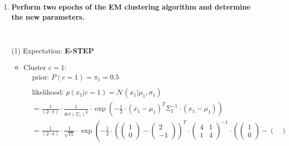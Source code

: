 \documentclass[12pt]{article}
\begin{document}
\begin{enumerate}
    \item \textbf{Perform two epochs of the EM clustering algorithm and determine the new parameters.}
    
    \vspace{10pt}
    \colorbox{codeblue}{\textcolor{white}{FIRST EM EPOCH}}

    \vspace{10pt}
    (1) Expectation: \textbf{\textcolor{codeblue}{E-STEP}}
        
        \vspace{10pt}

        \vspace{10pt}
        \begin{itemize}[label=]
            \item Cluster $c=1$:
            \begin{equation*}
                \begin{aligned}
                    &\text{prior: } P(c=1) = \pi_1 = \mathbf{0.5} \\
                    \\
                    &\text{likelihood: } p(x_1|c=1) = \mathcal{N}(x_1| \mu_1, \sigma_1) \\
                    &= \frac{1}{(2 \cdot \pi)} \cdot \frac{1}{det(\Sigma_1)^{\frac{1}{2}}} \cdot \exp \left( -\frac{1}{2} \cdot (x_1 - \mu_1)^{T} \Sigma_1^{-1} \cdot (x_1 - \mu_1) \right)\\
                    &= \frac{1}{(2 \cdot \pi)} \cdot \frac{1}{\sqrt{15}} \cdot \exp \left( -\frac{1}{2} \cdot \left(\begin{pmatrix}
                    1\\
                    0
                    \end{pmatrix} - \begin{pmatrix}
                    2\\
                    -1
                    \end{pmatrix}\right)^{T} \cdot \begin{pmatrix}
                    4 & 1\\
                    1 & 4
                    \end{pmatrix}^{-1} \cdot \left(\begin{pmatrix}
                    1\\
                    0
                    \end{pmatrix} - \begin{pmatrix}

\end{pmatrix}
\end{aligned}
\end{equation*}
\end{itemize}
\end{enumerate}
\end{document}
